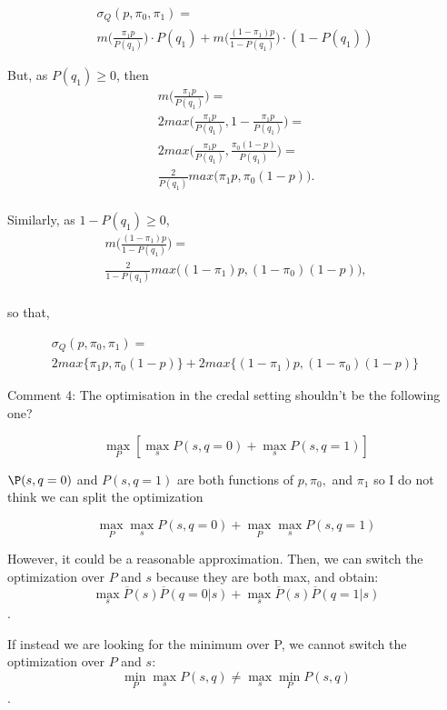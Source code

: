 \documentclass[runningheads]{llncs}
\begin{document}
	\begin{multline}
		\sigma_Q(p,\pi_0,\pi_1)=\\
		m\bigl(\frac{\pi_1 p}{P(q_1)}\bigr) \cdot P(q_1)  +
		m\bigl(\frac{(1-\pi_1) p}{1-P(q_1)}\bigr) \cdot (1-P(q_1))\,
	\end{multline}
	
	But, as $P(q_1)\geq 0$, then
	\begin{multline}
		m\bigl(\frac{\pi_1 p}{P(q_1)}\bigr) =\\
		2max\bigl(\frac{\pi_1 p}{P(q_1)},1-\frac{\pi_1 p}{P(q_1)} \bigr) =\\
		2max\bigl(\frac{\pi_1 p}{P(q_1)},\frac{\pi_0(1- p)}{P(q_1)} \bigr) =\\
		\frac{2}{P(q_1)}max\bigl(\pi_1 p,\pi_0(1- p)\bigr).\\
	\end{multline}
	
	Similarly, as $1-P(q_1)\geq 0$, 
	\begin{multline}
		m\bigl(\frac{(1-\pi_1) p}{1-P(q_1)}\bigr) =\\
		\frac{2}{1-P(q_1)}max\bigl((1-\pi_1) p,(1-\pi_0)(1- p)\bigr),\\
	\end{multline}
	
	so that,
	
	\begin{multline}
		\sigma_Q(p,\pi_0,\pi_1)= \\
		2 max\{\pi_1 p, \pi_0 (1-p)\}+
		2 max\{(1-\pi_1 )p, (1-\pi_0) (1-p)\}\,
	\end{multline}
	
	Comment 4: The optimisation in the credal setting shouldn't be the following one?
	
	$$\max_P [\max_s P(s,q=0)+\max_s P(s,q=1)]$$ 
	
	$\P(s,q=0)$ and $P(s,q=1)$ are both functions of $p, \pi_0,$ and $\pi_1$ so I do not 
	think we can split the optimization
	
	$$\max_P \max_s P(s,q=0)+\max_P\max_s P(s,q=1)$$ 
	
	However, it could be a reasonable approximation. Then, we can switch the optimization 
	over $P$ and $s$ because they are both max, and obtain: 
	$$\max_s \overline{P}(s)\overline{P}(q=0|s)+\max_s  \overline{P}(s)\overline{P}(q=1|s)$$.
	
	If instead we are looking for the minimum over P, we cannot switch the optimization 
	over $P$ and $s$:
	$$\min_P \max_s P(s,q) \neq \max_s \min_P P(s,q)$$.
	
\end{document}
